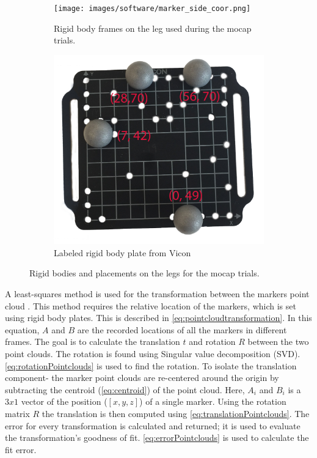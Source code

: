 \begin{figure}
\centering 
\begin{subfigure}{0.4\linewidth} 
  \centering 
  \texttt{[image: images/software/marker\_side\_coor.png]} 
  \caption[RigidBody Frames]{Rigid body frames on the leg used during the mocap trials.} 
  \label{fig:markers_side} 
\end{subfigure} 
%
\begin{subfigure}{0.4\linewidth} 
  \centering 
    \centering
    \includegraphics[scale=0.11]{images/software/rigidbody_label.png} 
    \caption{Labeled rigid body plate from Vicon}
    \label{fig:rigidbody}
\end{subfigure} 
\caption[Rigidbodies and Placement]{Rigid bodies and placements on the legs for the mocap trials.} 
\label{fig:markers} 

\end{figure} 

A least-squares method is used for the transformation between the markers point cloud \cite{arun1987least}. This method requires the relative location of the markers, which is set using rigid body plates. This is described in \autoref{eq:pointcloudtransformation}. In this equation, $A$ and $B$ are the recorded locations of all the markers in different frames. The goal is to calculate the translation $t$ and rotation $R$ between the two point clouds. The rotation is found using Singular value decomposition (SVD). \autoref{eq:rotationPointclouds} is used to find the rotation. To isolate the translation component- the marker point clouds are re-centered around the origin by subtracting the centroid (\autoref{eq:centroid}) of the point cloud. Here, $A_i$ and $B_i$ is a $3x1$ vector of the position ($[x,y,z]$) of a single marker. Using the rotation matrix $R$ the translation is then computed using  \autoref{eq:translationPointclouds}.  The error for every transformation is calculated and returned; it is used to evaluate the transformation's goodness of fit. \autoref{eq:errorPointclouds} is used to calculate the fit error.   


